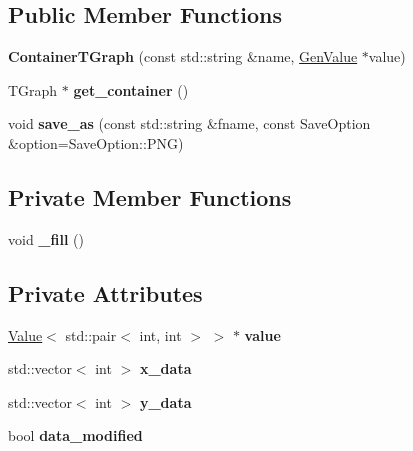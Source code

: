 \subsection*{Public Member Functions}
\begin{DoxyCompactItemize}
\item 
\hypertarget{classfv_1_1root_1_1ContainerTGraph_a6ce03e340c2e2f5922ba6a9799eee7ef}{}\label{classfv_1_1root_1_1ContainerTGraph_a6ce03e340c2e2f5922ba6a9799eee7ef} 
{\bfseries Container\+T\+Graph} (const std\+::string \&name, \hyperlink{classfv_1_1GenValue}{Gen\+Value} $\ast$value)
\item 
\hypertarget{classfv_1_1root_1_1ContainerTGraph_a0d34a4afcd209b05353dce701e416b87}{}\label{classfv_1_1root_1_1ContainerTGraph_a0d34a4afcd209b05353dce701e416b87} 
T\+Graph $\ast$ {\bfseries get\+\_\+container} ()
\item 
\hypertarget{classfv_1_1root_1_1ContainerTGraph_a0269333d693b56b4e29c373cca6d64d8}{}\label{classfv_1_1root_1_1ContainerTGraph_a0269333d693b56b4e29c373cca6d64d8} 
void {\bfseries save\+\_\+as} (const std\+::string \&fname, const Save\+Option \&option=Save\+Option\+::\+P\+NG)
\end{DoxyCompactItemize}
\subsection*{Private Member Functions}
\begin{DoxyCompactItemize}
\item 
\hypertarget{classfv_1_1root_1_1ContainerTGraph_a7d0e25feb16f85c305fda6667554b6dc}{}\label{classfv_1_1root_1_1ContainerTGraph_a7d0e25feb16f85c305fda6667554b6dc} 
void {\bfseries \+\_\+fill} ()
\end{DoxyCompactItemize}
\subsection*{Private Attributes}
\begin{DoxyCompactItemize}
\item 
\hypertarget{classfv_1_1root_1_1ContainerTGraph_a5b58f77ca3c34042d4ca7d7bf91ccdb1}{}\label{classfv_1_1root_1_1ContainerTGraph_a5b58f77ca3c34042d4ca7d7bf91ccdb1} 
\hyperlink{classfv_1_1Value}{Value}$<$ std\+::pair$<$ int, int $>$ $>$ $\ast$ {\bfseries value}
\item 
\hypertarget{classfv_1_1root_1_1ContainerTGraph_ae518129625f7a8100f5800d418f05c2e}{}\label{classfv_1_1root_1_1ContainerTGraph_ae518129625f7a8100f5800d418f05c2e} 
std\+::vector$<$ int $>$ {\bfseries x\+\_\+data}
\item 
\hypertarget{classfv_1_1root_1_1ContainerTGraph_a7f971c3080be619b6fe83150caccfe68}{}\label{classfv_1_1root_1_1ContainerTGraph_a7f971c3080be619b6fe83150caccfe68} 
std\+::vector$<$ int $>$ {\bfseries y\+\_\+data}
\item 
\hypertarget{classfv_1_1root_1_1ContainerTGraph_aef25624d82dc794957ecfc13e853c165}{}\label{classfv_1_1root_1_1ContainerTGraph_aef25624d82dc794957ecfc13e853c165} 
bool {\bfseries data\+\_\+modified}
\end{DoxyCompactItemize}
